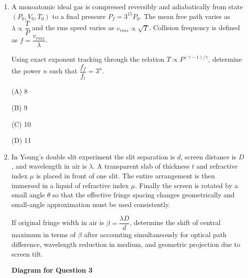 \documentclass[12pt]{article}
\begin{document}
\begin{enumerate}
(D) $RT_0 \ln 9 \left(1-9^{-4/3}\right)$  

\item A monoatomic ideal gas is compressed reversibly and adiabatically from state $(P_0,V_0,T_0)$ to a final pressure $P_f = 3^{15}P_0$. The mean free path varies as $\lambda \propto \dfrac{T}{P}$ and the rms speed varies as $v_{rms}\propto \sqrt{T}$. Collision frequency is defined as $f=\dfrac{v_{rms}}{\lambda}$.

Using exact exponent tracking through the relation $T\propto P^{(\gamma-1)/\gamma}$, determine the power $n$ such that $\dfrac{f_f}{f_i}=3^{n}$.

(A) 8  

(B) 9  

(C) 10  

(D) 11  

\item In Young’s double slit experiment the slit separation is $d$, screen distance is $D$, and wavelength in air is $\lambda$. A transparent slab of thickness $t$ and refractive index $\mu$ is placed in front of one slit. The entire arrangement is then immersed in a liquid of refractive index $\mu$. Finally the screen is rotated by a small angle $\theta$ so that the effective fringe spacing changes geometrically and small-angle approximation must be used consistently.

If original fringe width in air is $\beta=\dfrac{\lambda D}{d}$, determine the shift of central maximum in terms of $\beta$ after accounting simultaneously for optical path difference, wavelength reduction in medium, and geometric projection due to screen tilt.


\begin{center}
\textbf{Diagram for Question 3}
\end{center}

\end{enumerate}
\end{document}

